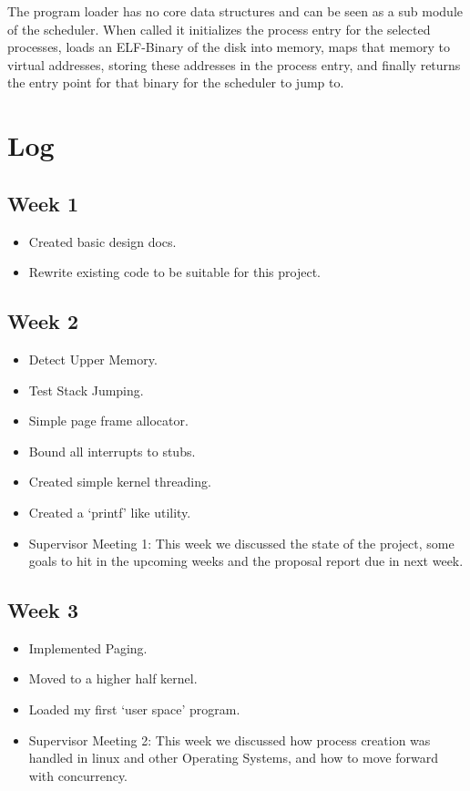 \documentclass[a4paper]{report}
\begin{document}
The program loader has no core data structures and can be seen as a sub module of the scheduler. When called it initializes the process entry for the selected processes, loads an ELF-Binary of the disk into memory, maps that memory to virtual addresses, storing these addresses in the process entry, and finally returns the entry point for that binary for the scheduler to jump to.
















\chapter{Log}


\section{Week 1}
\begin{itemize}
\item Created basic design docs.
\item Rewrite existing code to be suitable for this project.
\end{itemize}

\section{Week 2}
\begin{itemize}
\item Detect Upper Memory.
\item Test Stack Jumping.
\item Simple page frame allocator.
\item Bound all interrupts to stubs.
\item Created simple kernel threading.
\item Created a `printf' like utility.
\item Supervisor Meeting 1: This week we discussed the state of the project, some goals to hit in the upcoming weeks and the proposal report due in next week.
\end{itemize}

\section{Week 3}
\begin{itemize}
\item Implemented Paging.
\item Moved to a higher half kernel.
\item Loaded my first `user space' program.
\item Supervisor Meeting 2: This week we discussed how process creation was handled in linux and other Operating Systems, and how to move forward with concurrency.
\end{itemize}
\end{document}
